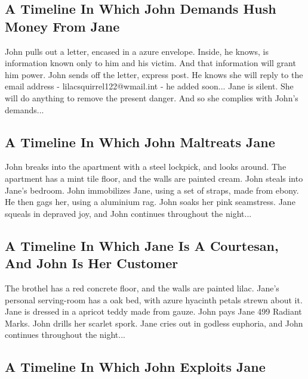 \documentclass{article}
\begin{document}
\subsection{A Timeline In Which John Demands Hush Money From Jane}


John pulls out a letter, encased in a azure envelope. Inside, he knows, is information known only to him and his victim. And that information will grant him power.
John sends off the letter, express post. He knows she will reply to the email address {-} lilacsquirrel122@wmail.int {-} he added soon...
Jane is silent. She will do anything to remove the present danger. And so she complies with John's demands...
\subsection{A Timeline In Which John Maltreats Jane}


John breaks into the apartment with a steel lockpick, and looks around.
The apartment has a mint tile floor, and the walls are painted cream.
John steals into Jane's bedroom.
John immobilizes Jane, using a set of straps, made from ebony.
He then gags her, using a aluminium rag.
John soaks her pink seamstress.
Jane squeals in depraved joy, and John continues throughout the night...
\subsection{A Timeline In Which Jane Is A Courtesan, And John Is Her Customer}


The brothel has a red concrete floor, and the walls are painted lilac.
Jane's personal serving{-}room has a oak bed, with azure hyacinth petals strewn about it.
Jane is dressed in a apricot teddy made from gauze.
John pays Jane 499 Radiant Marks.
John drills her scarlet spork.
Jane cries out in godless euphoria, and John continues throughout the night...
\subsection{A Timeline In Which John Exploits Jane}
\end{document}
